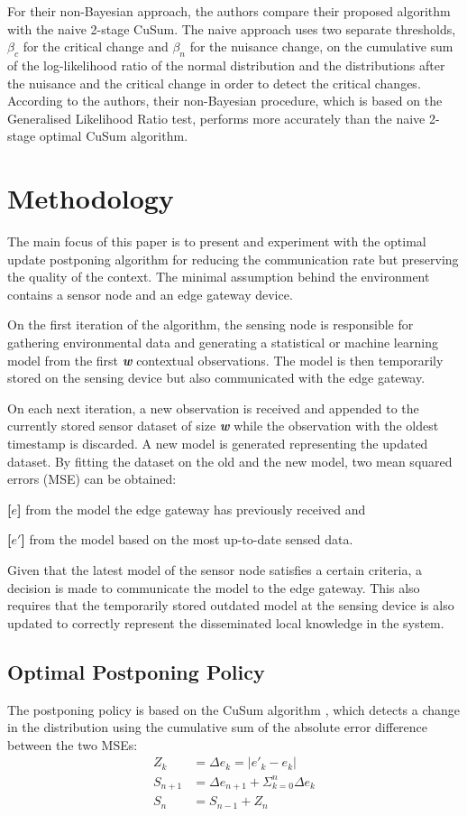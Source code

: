 \documentclass{mpaper}
\begin{document}
For their non-Bayesian approach, the authors compare their proposed algorithm with the naive 2-stage CuSum. The naive approach uses two separate thresholds, $\beta_c$ for the critical change and $\beta_n$ for the nuisance change, on the cumulative sum of the log-likelihood ratio of the normal distribution and the distributions after the nuisance and the critical change in order to detect the critical changes.
According to the authors, their non-Bayesian procedure, which is based on the Generalised Likelihood Ratio test, performs more accurately than the naive 2-stage optimal CuSum algorithm.

\section{Methodology}

The main focus of this paper is to present and experiment with the optimal update postponing algorithm for reducing the communication rate but preserving the quality of the context. 
The minimal assumption behind the environment contains a sensor node and an edge gateway device. 

On the first iteration of the algorithm, the sensing node is responsible for gathering environmental data and generating a statistical or machine learning model from the first \textbf{\emph{w}} contextual observations. The model is then temporarily stored on the sensing device but also communicated with the edge gateway.

On each next iteration, a new observation is received and appended to the currently stored sensor dataset of size \textbf{\emph{w}} while the observation with the oldest timestamp is discarded. A new model is generated representing the updated dataset. By fitting the dataset on the old and the new model, two mean squared errors (MSE) can be obtained:

\textbf{[$e$]} from the model the edge gateway has previously received and

\textbf{[$e'$]} from the model based on the most up-to-date sensed data.

Given that the latest model of the sensor node satisfies a certain criteria, a decision is made to communicate the model to the edge gateway. This also requires that the temporarily stored outdated model at the sensing device is also updated to correctly represent the disseminated local knowledge in the system.

\subsection*{Optimal Postponing Policy}
The postponing policy is based on the CuSum algorithm \cite{page1954}, which detects a change in the distribution using the cumulative sum of the absolute error difference between the two MSEs:
\begin{align}
    Z_k &= \Delta e_k = | e'_k - e_k |\\
    S_{n+1} &= \Delta e_{n+1} + \Sigma_{k=0}^n \Delta e_k\\
    S_n &= S_{n-1} + Z_n\label{eq:1}
\end{align}
\end{document}

